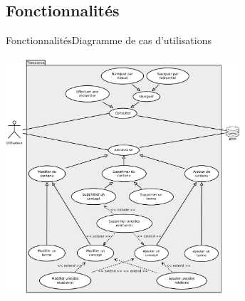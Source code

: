 \subsection{Fonctionnalités}
\begin{frame}{Fonctionnalités}{Diagramme de cas d'utilisations}
\begin{center}
\includegraphics[width=0.65\textwidth]{files/usecase}
\end{center}
\end{frame}